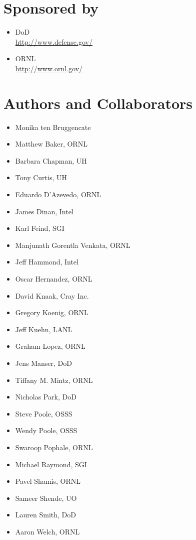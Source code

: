 \section*{Sponsored by}
\begin{itemize}
\item \ac{DoD}\\
  \url{http://www.defense.gov/ }
\item \ac{ORNL}\\
  \url{http://www.ornl.gov/} 
\end{itemize}

\section*{Authors and Collaborators}
\begin{itemize}
\item Monika ten Bruggencate
\item Matthew Baker, \ac{ORNL}
\item Barbara Chapman, \ac{UH} 
\item Tony Curtis, \ac{UH}
\item Eduardo D'Azevedo, \ac{ORNL}
\item James Dinan, Intel
\item Karl Feind, SGI
\item Manjunath Gorentla Venkata, \ac{ORNL}
\item Jeff Hammond, Intel
\item Oscar Hernandez, \ac{ORNL}
\item David Knaak, Cray Inc.
\item Gregory Koenig, \ac{ORNL}
\item Jeff Kuehn, \ac{LANL}
\item Graham Lopez, \ac{ORNL}
\item Jens Manser, \ac{DoD}
\item Tiffany M. Mintz, \ac{ORNL}
\item Nicholas Park, \ac{DoD}
\item Steve Poole, OSSS
\item Wendy Poole, OSSS
\item Swaroop Pophale, \ac{ORNL}
\item Michael Raymond, SGI
\item Pavel Shamis, \ac{ORNL}
\item Sameer Shende, \ac{UO}
\item Lauren Smith, \ac{DoD}
\item Aaron Welch, \ac{ORNL}

\end{itemize}


